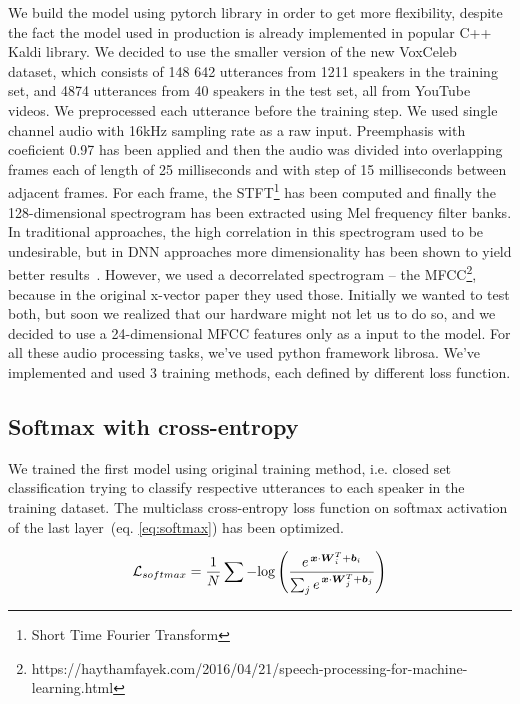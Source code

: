 We build the model using pytorch library in order to get more flexibility, despite the fact the model used in production is already implemented in popular C++ Kaldi library. We decided to use the smaller version of the new VoxCeleb~\cite{VoxCeleb} dataset, which consists of 148 642 utterances from 1211 speakers in the training set, and 4874 utterances from 40 speakers in the test set, all from YouTube videos. We preprocessed each utterance before the training step. We used single channel audio with 16kHz sampling rate as a raw input. Preemphasis with coeficient 0.97 has been applied and then the audio was divided into overlapping frames each of length of 25 milliseconds and with step of 15 milliseconds between adjacent frames. For each frame, the STFT\footnote{Short Time Fourier Transform} has been computed and finally the 128-dimensional spectrogram has been extracted using Mel frequency filter banks. In traditional approaches, the high correlation in this spectrogram used to be undesirable, but in DNN approaches more dimensionality has been shown to yield better results~\cite{CNN_2016}. However, we used a decorrelated spectrogram -- the MFCC\footnote{https://haythamfayek.com/2016/04/21/speech-processing-for-machine-learning.html}, because in the original x-vector paper they used those. Initially we wanted to test both, but soon we realized that our hardware might not let us to do so, and we decided to use a 24-dimensional MFCC features only as a input to the model. For all these audio processing tasks, we've used python framework librosa. We've implemented and used 3 training methods, each defined by different loss function.

\subsection*{Softmax with cross-entropy}

We trained the first model using original training method, i.e. closed set classification trying to classify respective utterances to each speaker in the training dataset. The multiclass cross-entropy loss function on softmax activation of the last layer~(eq. \ref{eq:softmax}) has been optimized.

\begin{equation} \label{eq:softmax}
\mathcal{L}_{softmax} = \frac{1}{N} \sum - \textnormal{log} \left( 
\frac{e^{\,\boldsymbol{x} \cdot \boldsymbol{W}_i^T + \boldsymbol{b}_i}}
{\sum_{j} e^{\,\boldsymbol{x} \cdot \boldsymbol{W}_j^T + \boldsymbol{b}_j}} 
\right)
\end{equation}

